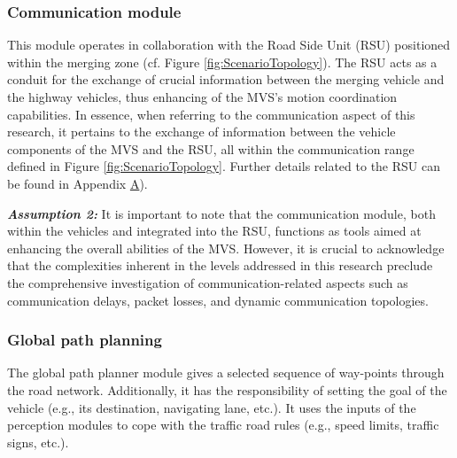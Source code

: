 \subsubsection{Communication module} \label{sec:communication_module}
  This module operates in collaboration with the Road Side Unit (RSU) positioned within the merging zone (cf. Figure \ref{fig:ScenarioTopology}). The RSU acts as a conduit for the exchange of crucial information between the merging vehicle and the highway vehicles, thus enhancing of the MVS's motion coordination capabilities. In essence, when referring to the communication aspect of this research, it pertains to the exchange of information between the vehicle components of the MVS and the RSU, all within the communication range defined in Figure \ref{fig:ScenarioTopology}. Further details related to the RSU can be found in Appendix \hyperlink{AppendixA}{A}). 

\textbf{\textit{Assumption 2:}} It is important to note that the communication module, both within the vehicles and integrated into the RSU, functions as tools aimed at enhancing the overall abilities of the MVS.  However, it is crucial to acknowledge that the complexities inherent in the levels addressed in this research preclude the comprehensive investigation of communication-related aspects such as communication delays, packet losses, and dynamic communication topologies. 
















\subsubsection{Global path planning}\label{sec:global_planner} 
The global path planner module gives a selected sequence of way-points through the road network. Additionally, it has the responsibility of setting the goal of the vehicle (e.g., its destination, navigating lane, etc.). It uses the inputs of the perception modules to cope with the traffic road rules 
(e.g., speed limits, traffic signs, etc.).


















